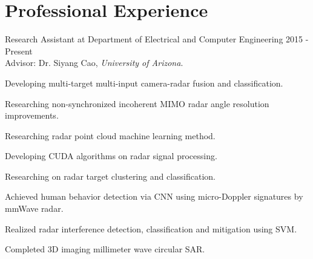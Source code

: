 \documentclass[letterpaper,9pt]{article}
\renewenvironment{itemize}{
  \begin{list}{}{
    \setlength{\topsep}{0pt}
    \setlength{\itemsep}{0pt}
    \setlength{\parsep}{0pt}
    \setlength{\partopsep}{0pt}
    \setlength{\leftmargin}{1.5em}
  }
}{\end{list}}
\begin{document}
\section*{Professional Experience}
\begin{itemize}
  \setlength{\itemsep}{1em}
  \item Research Assistant at Department of Electrical and Computer Engineering \hfill 2015 - Present\\
Advisor: Dr. Siyang Cao, {\it University of Arizona}.
  \begin{itemize}
    \item [$\bullet$] Developing multi-target multi-input camera-radar fusion and classification.
    \item [$\bullet$] Researching non-synchronized incoherent MIMO radar angle resolution improvements.
    \item [$\bullet$] Researching radar point cloud machine learning method.
    \item [$\bullet$] Developing CUDA algorithms on radar signal processing.
    \item [$\bullet$] Researching on radar target clustering and classification.
    \item [$\bullet$] Achieved human behavior detection via CNN using micro-Doppler signatures by
  mmWave radar.
    \item [$\bullet$] Realized radar interference detection, classification and mitigation using SVM.

    \item [$\bullet$] Completed 3D imaging millimeter wave circular SAR.
  \end{itemize}


\end{itemize}
\end{document}
